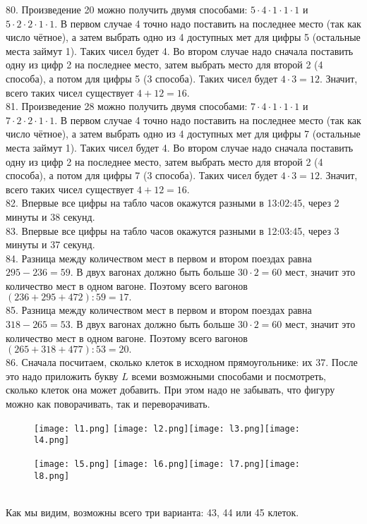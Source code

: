 80. Произведение 20 можно получить двумя способами: $5\cdot4\cdot1\cdot1\cdot1$ и $5\cdot2\cdot2\cdot1\cdot1.$ В первом случае 4 точно надо поставить на последнее место (так как число чётное), а затем выбрать одно из 4 доступных мет для цифры 5 (остальные места займут 1). Таких чисел будет 4. Во втором случае надо сначала поставить одну из цифр 2 на последнее место, затем выбрать место для второй 2 (4 способа), а потом для цифры 5 (3 способа). Таких чисел будет $4\cdot3=12.$ Значит, всего таких чисел существует $4+12=16.$\\
81. Произведение 28 можно получить двумя способами: $7\cdot4\cdot1\cdot1\cdot1$ и $7\cdot2\cdot2\cdot1\cdot1.$ В первом случае 4 точно надо поставить на последнее место (так как число чётное), а затем выбрать одно из 4 доступных мет для цифры 7 (остальные места займут 1). Таких чисел будет 4. Во втором случае надо сначала поставить одну из цифр 2 на последнее место, затем выбрать место для второй 2 (4 способа), а потом для цифры 7 (3 способа). Таких чисел будет $4\cdot3=12.$ Значит, всего таких чисел существует $4+12=16.$\\
82. Впервые все цифры на табло часов окажутся разными в 13:02:45, через 2 минуты и 38 секунд.\\
83. Впервые все цифры на табло часов окажутся разными в 12:03:45, через 3 минуты и 37 секунд.\\
84. Разница между количеством мест в первом и втором поездах равна $295-236=59.$ В двух вагонах должно быть больше $30\cdot2=60$ мест, значит это количество мест в одном вагоне. Поэтому всего вагонов $(236+295+472):59=17.$\\
85. Разница между количеством мест в первом и втором поездах равна $318-265=53.$ В двух вагонах должно быть больше $30\cdot2=60$ мест, значит это количество мест в одном вагоне. Поэтому всего вагонов $(265+318+477):53=20.$\\
86. Сначала посчитаем, сколько клеток в исходном прямоугольнике: их 37. После это надо приложить букву $L$ всеми возможными способами и посмотреть, сколько клеток она может добавить. При этом надо не забывать, что фигуру можно как поворачивать, так и переворачивать.
\begin{figure}[ht!]
\texttt{[image: l1.png]} \texttt{[image: l2.png]}\texttt{[image: l3.png]}\texttt{[image: l4.png]}\end{figure}
\begin{figure}[ht!]\texttt{[image: l5.png]} \texttt{[image: l6.png]}\texttt{[image: l7.png]}\texttt{[image: l8.png]}
\end{figure}\\
Как мы видим, возможны всего три варианта: 43, 44 или 45 клеток.

